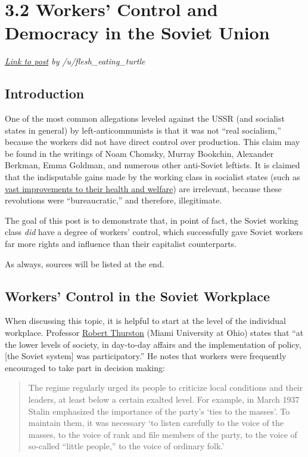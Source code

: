 \section{3.2 Workers' Control and Democracy in the Soviet Union}

\emph{\href{https://www.reddit.com/r/communism/comments/ehpdbp/masterpost_on_workers_control_and_democracy_in/}{Link
to post} by /u/flesh\_eating\_turtle}

\subsection*{Introduction}

One of the most common allegations leveled against the USSR (and
socialist states in general) by left-anticommunists is that it was not
``real socialism,'' because the workers did not have direct control over
production. This claim may be found in the writings of Noam Chomsky,
Murray Bookchin, Alexander Berkman, Emma Goldman, and numerous other
anti-Soviet leftists. It is claimed that the indisputable gains made by
the working class in socialist states (such as
\href{https://journals.sagepub.com/doi/abs/10.2190/B2TP-3R5M-Q7UP-DUA2}{vast
improvements to their health and welfare}) are irrelevant, because these
revolutions were ``bureaucratic,'' and therefore, illegitimate.

The goal of this post is to demonstrate that, in point of fact, the
Soviet working class \emph{did} have a degree of workers' control, which
successfully gave Soviet workers far more rights and influence than
their capitalist counterparts.

As always, sources will be listed at the end.

\subsection*{Workers' Control in the Soviet Workplace}

When discussing this topic, it is helpful to start at the level of the
individual workplace. Professor
\href{http://miamioh.edu/cas/academics/departments/history/about/faculty/emeriti-faculty/thurston/index.html}{Robert
Thurston} (Miami University at Ohio) states that ``at the lower levels
of society, in day-to-day affairs and the implementation of policy,
{[}the Soviet system{]} was participatory.'' He notes that workers were
frequently encouraged to take part in decision making:

\begin{quote}
The regime regularly urged its people to criticize local conditions and
their leaders, at least below a certain exalted level. For example, in
March 1937 Stalin emphasized the importance of the party's `ties to the
masses'. To maintain them, it was necessary `to listen carefully to the
voice of the masses, to the voice of rank and file members of the party,
to the voice of so-called ``little people,'' to the voice of ordinary
folk.'
\end{quote}

